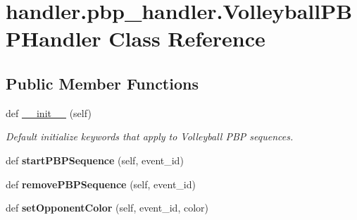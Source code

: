 \hypertarget{classhandler_1_1pbp__handler_1_1_volleyball_p_b_p_handler}{}\section{handler.\+pbp\+\_\+handler.\+Volleyball\+P\+B\+P\+Handler Class Reference}
\label{classhandler_1_1pbp__handler_1_1_volleyball_p_b_p_handler}
\subsection*{Public Member Functions}
\begin{DoxyCompactItemize}
\item 
\mbox{\label{classhandler_1_1pbp__handler_1_1_volleyball_p_b_p_handler_aaf8bf93acc9d40e5cc83d7e923032b17}} 
def \hyperlink{classhandler_1_1pbp__handler_1_1_volleyball_p_b_p_handler_aaf8bf93acc9d40e5cc83d7e923032b17}{\+\_\+\+\_\+init\+\_\+\+\_\+} (self)
\begin{DoxyCompactList}\small\item\em Default initialize keywords that apply to Volleyball P\+BP sequences. \end{DoxyCompactList}\item 
\mbox{\label{classhandler_1_1pbp__handler_1_1_volleyball_p_b_p_handler_a728bf0cbfec68f2590d87e1b51c80d17}} 
def {\bfseries start\+P\+B\+P\+Sequence} (self, event\+\_\+id)
\item 
\mbox{\label{classhandler_1_1pbp__handler_1_1_volleyball_p_b_p_handler_aa7a063557f9cdc12d419d3077d77a813}} 
def {\bfseries remove\+P\+B\+P\+Sequence} (self, event\+\_\+id)
\item 
\mbox{\label{classhandler_1_1pbp__handler_1_1_volleyball_p_b_p_handler_a001188443e41ef56a85e3ca54e51869c}} 
def {\bfseries set\+Opponent\+Color} (self, event\+\_\+id, color)
\item 
\mbox{\label{classhandler_1_1pbp__handler_1_1_volleyball_p_b_p_handler_aa7e3f8cd0284a25bcc7aca460f280a67}} 

\end{DoxyCompactItemize}
